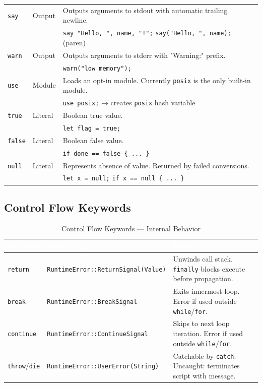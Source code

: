 \begin{longtable}{@{}llp{8cm}@{}}
\texttt{say} & Output &
Outputs arguments to stdout with automatic trailing newline.\\
& & \texttt{say "Hello, ", name, "!";} \hspace{1em} \texttt{say("Hello, ", name);} (paren) \\

\texttt{warn} & Output &
Outputs arguments to stderr with "Warning:" prefix.\\
& & \texttt{warn("low memory");} \\

\texttt{use} & Module &
Loads an opt-in module. Currently \texttt{posix} is the only built-in module.\\
& & \texttt{use posix;} → creates \texttt{posix} hash variable \\

\texttt{true} & Literal &
Boolean true value.\\
& & \texttt{let flag = true;} \\

\texttt{false} & Literal &
Boolean false value.\\
& & \texttt{if done == false \{ ... \}} \\

\texttt{null} & Literal &
Represents absence of value. Returned by failed conversions.\\
& & \texttt{let x = null;} \hspace{1em} \texttt{if x == null \{ ... \}} \\

\bottomrule
\end{longtable}

\clearpage
\subsection{Control Flow Keywords}

\begin{table}[H]
\centering
{}
\caption{\textcolor{darkpurple}{Control Flow Keywords — Internal Behavior}}
\vspace{0.3em}
\begin{tabular}{@{}llp{8cm}@{}}
\toprule
\rowcolor{softvioletdark}
\textbf{\textcolor{white}{Keyword}} & \textbf{\textcolor{white}{Sentinel Error}} & \textbf{\textcolor{white}{Behavior}} \\
\midrule
\texttt{return} & \texttt{RuntimeError::ReturnSignal(Value)} & Unwinds call stack. \texttt{finally} blocks execute before propagation. \\
\texttt{break} & \texttt{RuntimeError::BreakSignal} & Exits innermost loop. Error if used outside \texttt{while}/\texttt{for}. \\
\texttt{continue} & \texttt{RuntimeError::ContinueSignal} & Skips to next loop iteration. Error if used outside \texttt{while}/\texttt{for}. \\
\texttt{throw}/\texttt{die} & \texttt{RuntimeError::UserError(String)} & Catchable by \texttt{catch}. Uncaught: terminates script with message. \\
\bottomrule
\end{tabular}
\end{table}
